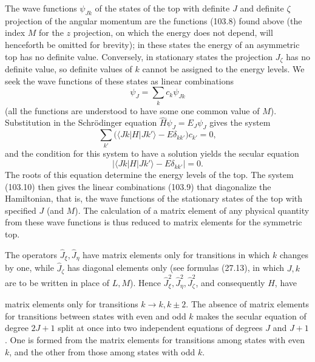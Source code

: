 The wave functions $\psi_{Jk}$ of the states of the top with definite $J$ and definite $\zeta$ projection of the angular momentum are the functions (103.8) found above (the index $M$ for the $z$ projection, on which the energy does not depend, will henceforth be omitted for brevity); in these states the energy of an asymmetric top has no definite value. Conversely, in stationary states the projection $J_\zeta$ has no definite value, so definite values of $k$ cannot be assigned to the energy levels. We seek the wave functions of these states as linear combinations
\begin{equation}
 \psi_J=\sum_k c_k\psi_{Jk} \tag{103.9}
\end{equation}
(all the functions are understood to have some one common value of $M$). Substitution in the Schrödinger equation $\hat H\psi_J=E_J\psi_J$ gives the system
\begin{equation}
 \sum_{k'}\bigl(\langle Jk|H|Jk'\rangle-E\delta_{kk'}\bigr)c_{k'}=0, \tag{103.10}
\end{equation}
and the condition for this system to have a solution yields the secular equation
\begin{equation}
 \left|\langle Jk|H|Jk'\rangle-E\delta_{kk'}\right|=0. \tag{103.11}
\end{equation}
The roots of this equation determine the energy levels of the top. The system (103.10) then gives the linear combinations (103.9) that diagonalize the Hamiltonian, that is, the wave functions of the stationary states of the top with specified $J$ (and $M$). The calculation of a matrix element of any physical quantity from these wave functions is thus reduced to matrix elements for the symmetric top.

The operators $\hat J_\xi,\hat J_\eta$ have matrix elements only for transitions in which $k$ changes by one, while $\hat J_\zeta$ has diagonal elements only (see formulas (27.13), in which $J,k$ are to be written in place of $L,M$). Hence $\hat J_\xi^2,\hat J_\eta^2,\hat J_\zeta^2$, and consequently $\hat H$, have

matrix elements only for transitions $k\to k,k\pm2$. The absence of matrix elements for transitions between states with even and odd $k$ makes the secular equation of degree $2J+1$ split at once into two independent equations of degrees $J$ and $J+1$. One is formed from the matrix elements for transitions among states with even $k$, and the other from those among states with odd $k$.

